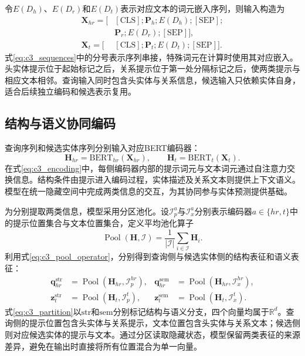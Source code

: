 令$E(D_h)$、$E(D_r)$和$E(D_t)$表示对应文本的词元嵌入序列，则输入构造为
\begin{equation}
\begin{aligned}
    \mathbf{X}_{hr}=[&\mathrm{[CLS]};\mathbf{P}_h;E(D_h);\mathrm{[SEP]};\\
                     &\mathbf{P}_r;E(D_r);\mathrm{[SEP]}],\\
    \mathbf{X}_t=[&\mathrm{[CLS]};\mathbf{P}_t;E(D_t);\mathrm{[SEP]}].
\end{aligned}
    \label{eq:c3_sequences}
\end{equation}
式\eqref{eq:c3_sequences}中的分号表示序列串接，特殊词元在计算时使用其对应嵌入。头实体提示位于起始标记之后，关系提示位于第一处分隔标记之后，使两类提示与相应文本相邻。查询输入同时包含头实体与关系信息，候选输入只依赖实体自身，适合后续独立编码和候选表示复用。

\subsection{结构与语义协同编码}

查询序列和候选实体序列分别输入对应BERT编码器：
\begin{equation}
    \mathbf{H}_{hr}=\mathrm{BERT}_{hr}(\mathbf{X}_{hr}),\qquad
    \mathbf{H}_{t}=\mathrm{BERT}_{t}(\mathbf{X}_{t}).
    \label{eq:c3_encoding}
\end{equation}
在式\eqref{eq:c3_encoding}中，每侧编码器内部的提示词元与文本词元通过自注意力交换信息。结构条件由提示进入编码过程，实体描述及关系文本则提供上下文语义。模型在统一隐藏空间中完成两类信息的交互，为其协同参与实体预测提供基础。

为分别提取两类信息，模型采用分区池化。设$\mathcal{I}_{p}^{a}$与$\mathcal{I}_{x}^{a}$分别表示编码器$a\in\{hr,t\}$中的提示位置集合与文本位置集合，定义平均池化算子
\begin{equation}
    \operatorname{Pool}(\mathbf{H},\mathcal{I})
       =\frac{1}{|\mathcal{I}|}\sum_{i\in\mathcal{I}}\mathbf{H}_i.
    \label{eq:c3_pool_operator}
\end{equation}
利用式\eqref{eq:c3_pool_operator}，分别得到查询侧与候选实体侧的结构表征和语义表征：
\begin{equation}
\begin{aligned}
    \mathbf{q}_{hr}^{\mathrm{str}}&=\operatorname{Pool}(\mathbf{H}_{hr},\mathcal{I}_{p}^{hr}),&
    \mathbf{q}_{hr}^{\mathrm{sem}}&=\operatorname{Pool}(\mathbf{H}_{hr},\mathcal{I}_{x}^{hr}),\\
    \mathbf{z}_{t}^{\mathrm{str}}&=\operatorname{Pool}(\mathbf{H}_{t},\mathcal{I}_{p}^{t}),&
    \mathbf{z}_{t}^{\mathrm{sem}}&=\operatorname{Pool}(\mathbf{H}_{t},\mathcal{I}_{x}^{t}).
\end{aligned}
    \label{eq:c3_partition}
\end{equation}
式\eqref{eq:c3_partition}以$\mathrm{str}$和$\mathrm{sem}$分别标记结构与语义分支，四个向量均属于$\mathbb{R}^{d}$。查询侧的提示位置包含头实体与关系提示，文本位置包含头实体与关系文本；候选侧则对应候选实体的提示与文本。通过分区读取隐藏状态，模型保留两类表征的来源差异，避免在输出时直接将所有位置混合为单一向量。

